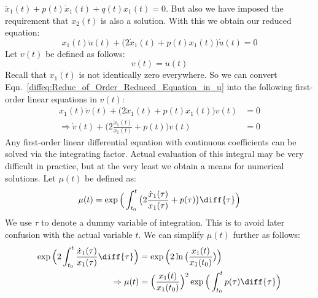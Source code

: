             $\ddot{x}_{1}(t)+p(t)\dot{x}_{1}(t)+q(t)x_{1}(t)=0$. But also
            we have imposed the requirement that $x_{2}(t)$ is also a
            solution. With this we obtain our reduced equation:
            \begin{equation}
                \label{diffeq:Reduc_of_Order_Reduced_Equation_in_u}
                x_{1}(t)\ddot{u}(t)+
                \big(2\dot{x}_{1}(t)+p(t)x_{1}(t)\big)\dot{u}(t)=0
            \end{equation}
            Let $v(t)$ be defined as follows:
            \begin{equation}
                \label{diffeq:reduction_term_v_of_u}
                v(t)=\dot{u}(t)
            \end{equation}
            Recall that $x_{1}(t)$ is not identically
            zero everywhere. So we can convert
            Eqn.~\ref{diffeq:Reduc_of_Order_Reduced_Equation_in_u}
            into the following first-order linear
            equations in $v(t)$:
            \begin{subequations}
                \begin{align}
                    x_{1}(t)\dot{v}(t)+
                    \big(2\dot{x}_{1}(t)+p(t)x_{1}(t)\big)v(t)&=0\\
                    \label{diffeq:reduction_of_order_first_order_ode}
                    \Rightarrow\dot{v}(t)+
                    \Big(2\frac{\dot{x}_{1}(t)}{x_{1}(t)}+p(t)\Big)v(t)
                    &=0
                \end{align}
            \end{subequations}
            Any first-order linear differential equation with
            continuous coefficients can be solved via the integrating
            factor. Actual evaluation of this integral may be very
            difficult in practice, but at the very least we obtain a means
            for numerical solutions. Let $\mu(t)$ be defined as:
            \begin{equation}
                \mu(t)=
                \exp\Big(\int_{t_{0}}^{t}
                    \big(2\frac{\dot{x}_{1}(\tau)}{x_{1}(\tau)}
                         +p(\tau)\big)\diff{\tau}\Big)
            \end{equation}
            We use $\tau$ to denote a dummy variable of integration. This is
            to avoid later confusion with the actual variable $t$.
            We can simplify $\mu(t)$ further as follows:
            \begin{subequations}
                \begin{align}
                    \exp\Big(2\int_{t_{0}}^{t}
                             \frac{\dot{x}_{1}(\tau)}{x_{1}(\tau)}
                             \diff{\tau}\Big)
                    &=\exp\Big(2\ln\big(\frac{x_{1}(t)}{x_{1}(t_{0})}\big)
                    \Big)\\
                    \Rightarrow\mu(t)
                    &=\Big(\frac{x_{1}(t)}{x_{1}(t_{0})}\Big)^{2}
                    \exp\Big(\int_{t_{0}}^{t}p(\tau)\diff{\tau}\Big)
                \end{align}
            \end{subequations}

